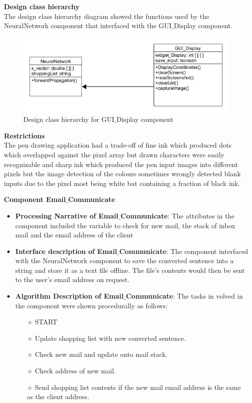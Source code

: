 \textbf{Design class hierarchy}\\
The design class hierarchy diagram showed the functions used by the NeuralNetwork component that interfaced with the GUI$\_$Display component.

\begin{figure}[h]
	\centering
	\includegraphics[scale=0.6]{43.jpg}
	\caption{Design class hierarchy for GUI$\_$Display component}
\end{figure}

\textbf{Restrictions}\\
The pen drawing application had a trade-off of fine ink which produced dots which overlapped against the pixel array but drawn characters were easily recognizable and sharp ink which produced the pen input images into different pixels but the image detection of the colours sometimes wrongly detected blank inputs due to the pixel most being white but containing a fraction of black ink.

\textbf{Component Email$\_$Communicate}
\begin{itemize}
	\item \textbf{Processing Narrative of Email$\_$Communicate}: The attributes in the component included the variable to check for new mail, the stack of inbox mail and the email address of the client
	\item  \textbf{Interface description of Email$\_$Communicate}: The component interfaced with the NeuralNetwork component to save the converted sentence into a string and store it as a text file offline. The file's contents would then be sent to the user's email address on request.
	\item \textbf{Algorithm Description of Email$\_$Communicate}: The tasks in volved in the component were shown procedurally as follows:
		\begin{itemize}
		\item[$\diamond$] START
		\item[$\diamond$] Update shopping list with new converted sentence.
		\item[$\diamond$] Check new mail and update onto mail stack.
		\item[$\diamond$] Check address of new mail.
		\item[$\diamond$] Send shopping list contents if the new mail email address is the same as the client address.
	\end{itemize}
\end{itemize}

